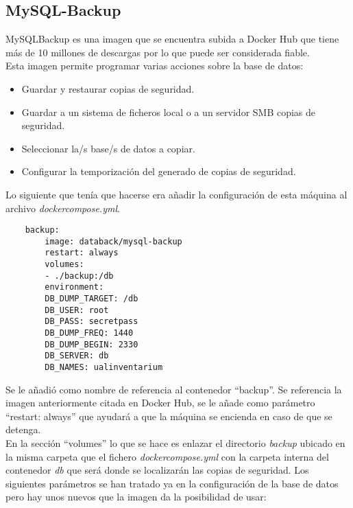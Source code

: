 \subsection{MySQL-Backup}
MySQL\-Backup \cite{mysql-backup} es una imagen que se encuentra subida a Docker Hub que tiene más de 10 millones de descargas por lo que puede ser considerada fiable.
\\Esta imagen permite programar varias acciones sobre la base de datos:
\begin{itemize}
    \item Guardar y restaurar copias de seguridad.
    \item Guardar a un sistema de ficheros local o a un servidor SMB copias de seguridad.
    \item Seleccionar la/s base/s de datos a copiar.
    \item Configurar la temporización del generado de copias de seguridad.
\end{itemize}
Lo siguiente que tenía que hacerse era añadir la configuración de esta máquina al archivo \textit{docker\-compose.yml}.
\begin{verbatim}
    backup:
        image: databack/mysql-backup
        restart: always
        volumes:
        - ./backup:/db
        environment:
        DB_DUMP_TARGET: /db
        DB_USER: root
        DB_PASS: secretpass
        DB_DUMP_FREQ: 1440
        DB_DUMP_BEGIN: 2330
        DB_SERVER: db
        DB_NAMES: ualinventarium
\end{verbatim}
Se le añadió como nombre de referencia al contenedor ``backup''. Se referencia la imagen anteriormente citada en Docker Hub, se le añade como parámetro ``restart: always'' que ayudará a que la máquina se encienda en caso de que se detenga.
\\En la sección ``volumes'' lo que se hace es enlazar el directorio \textit{backup} ubicado en la misma carpeta que el fichero \textit{docker\-compose.yml} con la carpeta interna del contenedor \textit{db} que será donde se localizarán las copias de seguridad. Los siguientes parámetros se han tratado ya en la configuración de la base de datos pero hay unos nuevos que la imagen da la posibilidad de usar:
